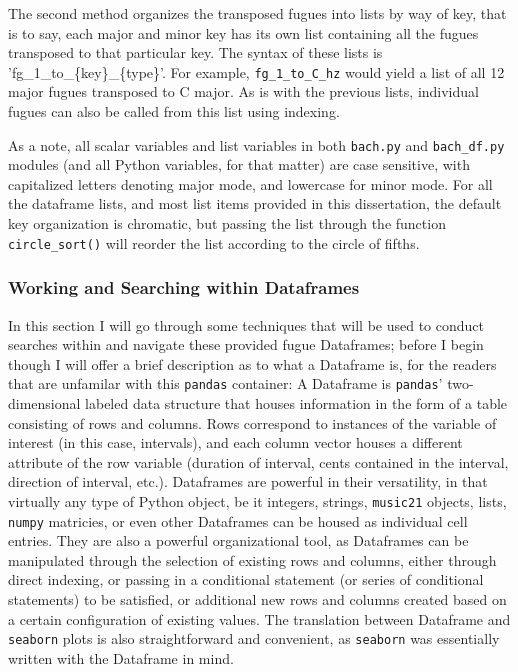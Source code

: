 The second method organizes the transposed fugues into lists by way of
key, that is to say, each major and minor key has its own list
containing all the fugues transposed to that particular key. The syntax
of these lists is 'fg\_1\_to\_\{key\}\_\{type\}'. For example,
\texttt{fg\_1\_to\_C\_hz} would yield a list of all 12 major fugues
transposed to C major. As is with the previous lists, individual fugues
can also be called from this list using indexing.

As a note, all scalar variables and list variables in both
\texttt{bach.py} and \texttt{bach\_df.py} modules (and all Python
variables, for that matter) are case sensitive, with capitalized letters
denoting major mode, and lowercase for minor mode. For all the dataframe
lists, and most list items provided in this dissertation, the default
key organization is chromatic, but passing the list through the function
\texttt{circle\_sort()} will reorder the list according to the circle of
fifths.

\subsubsection{Working and Searching within
Dataframes}\label{working-and-searching-within-dataframes}

In this section I will go through some techniques that will be used to
conduct searches within and navigate these provided fugue Dataframes;
before I begin though I will offer a brief description as to what a
Dataframe is, for the readers that are unfamilar with this
\texttt{pandas} container: A Dataframe is \texttt{pandas}'
two-dimensional labeled data structure that houses information in the
form of a table consisting of rows and columns. Rows correspond to
instances of the variable of interest (in this case, intervals), and
each column vector houses a different attribute of the row variable
(duration of interval, cents contained in the interval, direction of
interval, etc.). Dataframes are powerful in their versatility, in that
virtually any type of Python object, be it integers, strings,
\texttt{music21} objects, lists, \texttt{numpy} matricies, or even other
Dataframes can be housed as individual cell entries. They are also a
powerful organizational tool, as Dataframes can be manipulated through
the selection of existing rows and columns, either through direct
indexing, or passing in a conditional statement (or series of
conditional statements) to be satisfied, or additional new rows and
columns created based on a certain configuration of existing values. The
translation between Dataframe and \texttt{seaborn} plots is also
straightforward and convenient, as \texttt{seaborn} was essentially
written with the Dataframe in mind.

